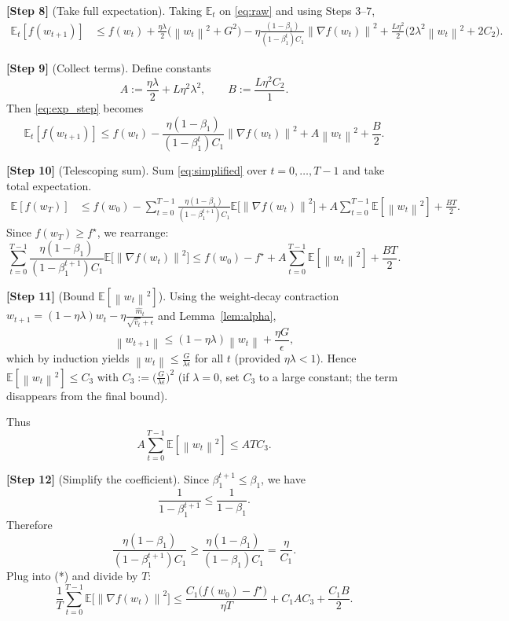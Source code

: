 \documentclass{article}
\newcommand{\E}{\mathbb{E}}
\newcommand{\norm}[1]{\left\lVert#1\right\rVert}
\begin{document}
\noindent\textbf{[Step 8]} (Take full expectation). Taking $\E_t$ on \eqref{eq:raw} and using Steps 3–7,
\begin{align}
\E_t[f(w_{t+1})]
&\le f(w_t)
+\frac{\eta\lambda}{2}\big(\norm{w_t}^2+G^2\big)
-\eta\frac{(1-\beta_1)}{(1-\beta_1^{t})C_1}\norm{\nabla f(w_t)}^2
+\frac{L\eta^2}{2}\big(2\lambda^2\norm{w_t}^2+2C_2\big).
\label{eq:exp_step}
\end{align}

\noindent\textbf{[Step 9]} (Collect terms). Define constants
\[
A:=\frac{\eta\lambda}{2}+L\eta^2\lambda^2,\qquad
B:=\frac{L\eta^2 C_2}{1}.
\]
Then \eqref{eq:exp_step} becomes
\begin{equation}
\E_t[f(w_{t+1})]\le f(w_t)-\frac{\eta(1-\beta_1)}{(1-\beta_1^{t})C_1}\norm{\nabla f(w_t)}^2
+ A\norm{w_t}^2 + \frac{B}{2}.
\label{eq:simplified}
\end{equation}

\noindent\textbf{[Step 10]} (Telescoping sum). Sum \eqref{eq:simplified} over $t=0,\dots,T-1$ and take total expectation.
\begin{align}
\E[f(w_T)] &\le f(w_0) -\sum_{t=0}^{T-1}
\frac{\eta(1-\beta_1)}{(1-\beta_1^{t+1})C_1}
\E\!\big[\norm{\nabla f(w_t)}^2\big]
+ A\sum_{t=0}^{T-1}\E[\norm{w_t}^2] +\frac{BT}{2}.
\label{eq:telesc}
\end{align}
Since $f(w_T)\ge f^\star$, we rearrange:
\[
\sum_{t=0}^{T-1}
\frac{\eta(1-\beta_1)}{(1-\beta_1^{t+1})C_1}
\E\!\big[\norm{\nabla f(w_t)}^2\big]
\le f(w_0)-f^\star
+ A\sum_{t=0}^{T-1}\E[\norm{w_t}^2] +\frac{BT}{2}.
\tag{*}
\]

\noindent\textbf{[Step 11]} (Bound $\E[\norm{w_t}^2]$). Using the weight‑decay contraction $w_{t+1}=(1-\eta\lambda)w_t-\eta\frac{\hat m_t}{\sqrt{\hat v_t}+\epsilon}$ and Lemma~\ref{lem:alpha},
\[
\norm{w_{t+1}} \le (1-\eta\lambda)\norm{w_t} + \frac{\eta G}{\epsilon},
\]
which by induction yields $\norm{w_t}\le \frac{G}{\lambda\epsilon}$ for all $t$ (provided $\eta\lambda<1$). Hence $\E[\norm{w_t}^2]\le C_3$ with $C_3:=\big(\frac{G}{\lambda\epsilon}\big)^2$ (if $\lambda=0$, set $C_3$ to a large constant; the term disappears from the final bound).

Thus
\[
A\sum_{t=0}^{T-1}\E[\norm{w_t}^2]\le AT C_3.
\]

\noindent\textbf{[Step 12]} (Simplify the coefficient). Since $\beta_1^{t+1}\le \beta_1$, we have
\[
\frac{1}{1-\beta_1^{t+1}}\le\frac{1}{1-\beta_1}.
\]
Therefore
\[
\frac{\eta(1-\beta_1)}{(1-\beta_1^{t+1})C_1}
\ge \frac{\eta(1-\beta_1)}{(1-\beta_1)C_1}
= \frac{\eta}{C_1}.
\]
Plug into (*) and divide by $T$:
\[
\frac{1}{T}\sum_{t=0}^{T-1}\E\!\big[\norm{\nabla f(w_t)}^2\big]
\le \frac{C_1\big(f(w_0)-f^\star\big)}{\eta T}
+ C_1 A C_3 + \frac{C_1 B}{2}.
\]
\end{document}
